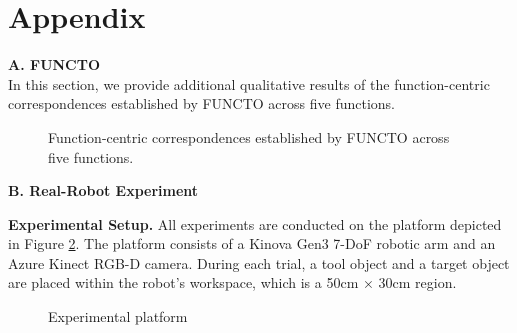 \clearpage
\onecolumn

\section{Appendix}
\noindent \textbf{A. FUNCTO} \\
In this section, we provide additional qualitative results of the function-centric correspondences established by FUNCTO across five functions.

\begin{figure}[h]
  \centering
  \caption{Function-centric correspondences established by FUNCTO across five functions.}
  \label{fig:functos}
\end{figure}


\newpage


\noindent \textbf{B. Real-Robot Experiment}

\noindent \textbf{Experimental Setup.} All experiments are conducted on the platform depicted in Figure \ref{fig:exp_setup}. The platform consists of a Kinova Gen3 7-DoF robotic arm and an Azure Kinect RGB-D camera. During each trial, a tool object and a target object are placed within the robot’s workspace, which is a 50cm × 30cm region.


\begin{figure}[h]
  \centering
  \vspace*{-0.1in}
    \vspace*{-0.1in}
  \caption{Experimental platform}
  \label{fig:exp_setup}
\end{figure}

